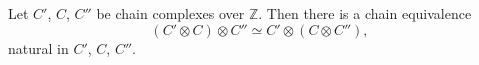 Let $C'$, $C$, $C''$ be chain complexes over $\mathbb{Z}$. Then there is a chain equivalence
$$(C' \otimes C) \otimes C'' \simeq C' \otimes (C \otimes C''),$$
natural in $C'$, $C$, $C''$.
